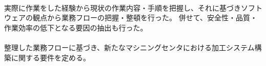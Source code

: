 {\paragraph*{\tpartconclusion}
実際に作業をした経験から現状の作業内容・手順を把握し、それに基づきソフトウェアの観点から業務フローの把握・整頓を行った。
併せて、安全性・品質・作業効率の低下となる要因の抽出も行った。
\tcbline*
\paragraph*{\tpartnextstep}
整理した業務フローに基づき、新たなマシニングセンタにおける加工システム構築に関する要件を定める。
}



%

\begin{appendices}
\end{appendices}

